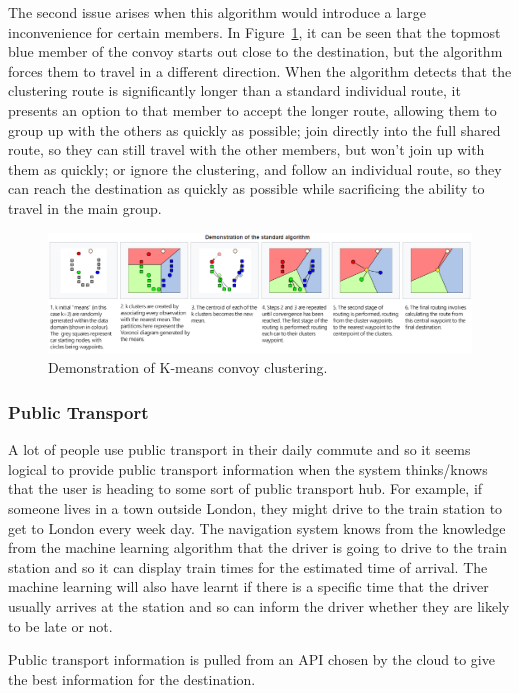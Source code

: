 \documentclass{article}
\begin{document}
The second issue arises when this algorithm would introduce a large inconvenience for certain members. In Figure~\ref{nav-kmeans}, it can be seen that the topmost blue member of the convoy starts out close to the destination, but the algorithm forces them to travel in a different direction. When the algorithm detects that the clustering route is significantly longer than a standard individual route, it presents an option to that member to accept the longer route, allowing them to group up with the others as quickly as possible; join directly into the full shared route, so they can still travel with the other members, but won't join up with them as quickly; or ignore the clustering, and follow an individual route, so they can reach the destination as quickly as possible while sacrificing the ability to travel in the main group.

\begin{figure}[H]
  \centering
  \includegraphics[scale=0.55]{kmeanscluster}
  \caption{Demonstration of K-means convoy clustering.}\label{nav-kmeans}
\end{figure}

\subsubsection{Public Transport}
A lot of people use public transport in their daily commute and so it seems logical to provide public transport information when the system thinks/knows that the user is heading to some sort of public transport hub. For example, if someone lives in a town outside London, they might drive to the train station to get to London every week day. The navigation system knows from the knowledge from the machine learning algorithm that the driver is going to drive to the train station and so it can display train times for the estimated time of arrival. The machine learning will also have learnt if there is a specific time that the driver usually arrives at the station and so can inform the driver whether they are likely to be late or not.

Public transport information is pulled from an API chosen by the cloud to give the best information for the destination.
\end{document}

